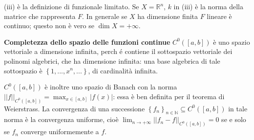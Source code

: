 \documentclass{article}
\begin{document}
(iii) \`{e} la definizione di funzionale limitato. Se $X=%
\mathbb{R}
^{n}$, $k$ in (iii) \`{e} la norma della matrice che rappresenta $F$. In
generale se $X$ ha dimensione finita $F$ lineare \`{e} continuo; questo non 
\`{e} vero se $\dim X=+\infty $.


\textbf{Completezza dello spazio delle funzioni continue} $C^{0}\left( \left[
a,b\right] \right) $ \`{e} uno spazio vettoriale a dimensione infinita, perch%
\'{e} contiene il sottospazio vettoriale dei polinomi algebrici, che ha
dimensione infinita: una base algebrica di tale sottospazio \`{e} $\left\{
1,...,x^{n},...\right\} $, di cardinalit\`{a} infinita.

$C^{0}\left( \left[ a,b\right] \right) $ \`{e} inoltre uno spazio di Banach
con la norma $\left\vert \left\vert f\right\vert \right\vert _{C^{0}\left( %
\left[ a,b\right] \right) }=\max_{x\in \left[ a,b\right] }\left\vert f\left(
x\right) \right\vert $: essa \`{e} ben definita per il teorema di
Weierstrass. La convergenza di una successione $\left\{ f_{n}\right\} _{n\in 
\mathbb{N}
}\subseteq C^{0}\left( \left[ a,b\right] \right) $ in tale norma \`{e} la
convergenza uniforme, cio\`{e} $\lim_{n\rightarrow +\infty }\left\vert
\left\vert f_{n}-f\right\vert \right\vert _{C^{0}\left( \left[ a,b\right]
\right) }=0$ se e solo se $f_{n}$ converge uniformemente a $f$.
\end{document}
